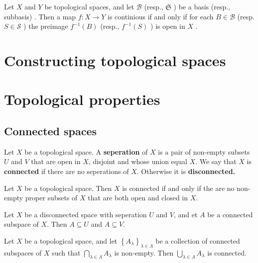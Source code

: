 \documentclass{article}
\theoremstyle{remark}
\begin{document}
\begin{theorem}
    Let $X$ and $Y$ be topological spaces, and let $ \mathscr{B} $ (resp., $\mathfrak{S} $ ) be a basis (resp.,
    subbasis) . Then a map $f: X \to Y  $ is continious if and only if for each $B \in \mathscr{B} $ (resp. $S \in
    \mathscr{S} $ ) the preimage $f^{-1} \left( B \right)$ (resp., $f^{-1} \left( S \right)$ ) is open in $X$   .
\end{theorem}

\section{ Constructing topological spaces}%
\label{sec:chapter_5_constructing_topological_spaces}

\section{ Topological properties}%
\label{sec:chapter_6_topological_properties}

\subsection{Connected spaces}%
\label{sub:connected_spaces}


\begin{definition}
Let $X$ be a topological space. A \textbf{seperation} of $X$ is a pair of non-empty subsets $U $ and $V$ that are open
in $X$, disjoint and whose union equal $X$. We say that $X$ is \textbf{connected} if there are no seperations of $X$.
Otherwise it is \textbf{disconnected.}
\end{definition}

\begin{theorem}
    Let $X$ be a topological space. Then $X$ is connected if and only if the are no non-empty proper subsets of $X$ that
    are both open and closed in $X$.

\end{theorem}

\begin{lemma}[Disconnectivity]
    Let $X$ be a disconnected space with seperation $U$ and $V$,  and et $A$ be a connected subspace of $X$. Then $A
    \subseteq U$ and $A \subseteq  V$.

\end{lemma}

\begin{theorem}
    Let $X$ be a topological space,  and let $\left\{ A_{\lambda } \right\}_{\lambda \in \Lambda }$ be a collection of
    connected subspaces of $X$ such that $ \bigcap_{\lambda  \in \Lambda } A_{\lambda }$ is non-empty. Then $\bigcup
    _{\lambda \in  \Lambda } A_{\lambda }$ is connected.

\end{theorem}
\end{document}
